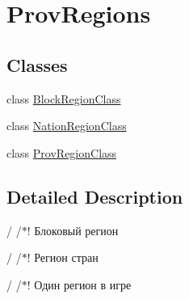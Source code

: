\hypertarget{group___prov_regions}{}\section{Prov\+Regions}
\label{group___prov_regions}
\subsection*{Classes}
\begin{DoxyCompactItemize}
\item 
class \hyperlink{class_block_region_class}{Block\+Region\+Class}
\item 
class \hyperlink{class_nation_region_class}{Nation\+Region\+Class}
\item 
class \hyperlink{class_prov_region_class}{Prov\+Region\+Class}
\end{DoxyCompactItemize}


\subsection{Detailed Description}
/ /$\ast$! Блоковый регион

/ /$\ast$! Регион стран

/ /$\ast$! Один регион в игре 